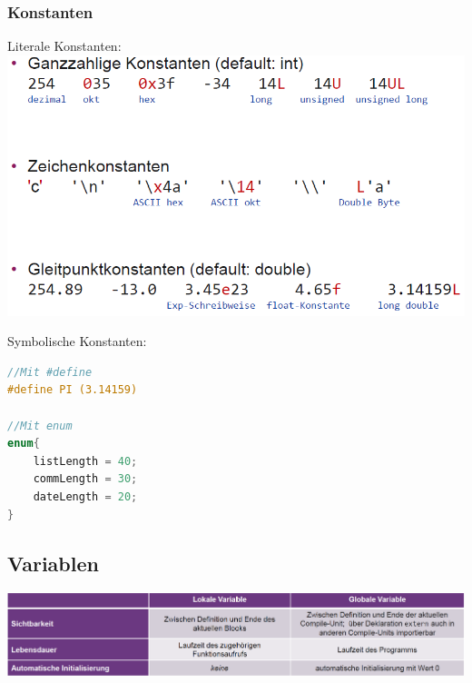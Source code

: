 		\subsubsection{Konstanten}
			\begin{minipage}{0.45\linewidth}
				Literale Konstanten:\\
				\includegraphics[width=1\linewidth]{Bilder/lit-konstanten.png}
			\end{minipage}
			\hfill
			\begin{minipage}{0.45\linewidth}
				Symbolische Konstanten:
				\begin{lstlisting}[language=C]
//Mit #define
#define PI (3.14159)

//Mit enum
enum{
	listLength = 40;
	commLength = 30;
	dateLength = 20;
}
				\end{lstlisting}
			\end{minipage}
		
	\subsection{Variablen}
		\begin{minipage}{1\linewidth}
			\includegraphics[width=1\linewidth]{Bilder/sichtbarkeit_variablen.png}
		\end{minipage}

